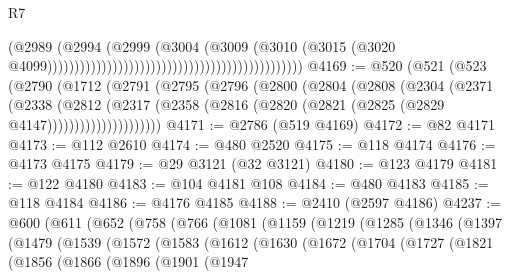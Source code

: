 \begin{lexlean}{R7}
\begin{coremodule}
                                                                                  (@2989
                                                                                    (@2994
                                                                                      (@2999
                                                                                        (@3004
                                                                                          (@3009
                                                                                            (@3010
                                                                                              (@3015
                                                                                                (@3020
                                                                                                  @4099)))))))))))))))))))))))))))))))))))))))))))))))
@4169 := @520
    (@521
      (@523
        (@2790
          (@1712
            (@2791
              (@2795
                (@2796
                  (@2800
                    (@2804
                      (@2808
                        (@2304
                          (@2371
                            (@2338
                              (@2812
                                (@2317
                                  (@2358
                                    (@2816 (@2820 (@2821 (@2825 (@2829 @4147)))))))))))))))))))))
@4171 := @2786 (@519 @4169)
@4172 := @82 @4171
@4173 := @112 @2610
@4174 := @480 @2520
@4175 := @118 @4174
@4176 := @4173 @4175
@4179 := @29 @3121 (@32 @3121)
@4180 := @123 @4179
@4181 := @122 @4180
@4183 := @104 @4181 @108
@4184 := @480 @4183
@4185 := @118 @4184
@4186 := @4176 @4185
@4188 := @2410 (@2597 @4186)
@4237 := @600
    (@611
      (@652
        (@758
          (@766
            (@1081
              (@1159
                (@1219
                  (@1285
                    (@1346
                      (@1397
                        (@1479
                          (@1539
                            (@1572
                              (@1583
                                (@1612
                                  (@1630
                                    (@1672
                                      (@1704
                                        (@1727
                                          (@1821
                                            (@1856
                                              (@1866
                                                (@1896
                                                  (@1901
                                                    (@1947

\end{coremodule}
\end{lexlean}
